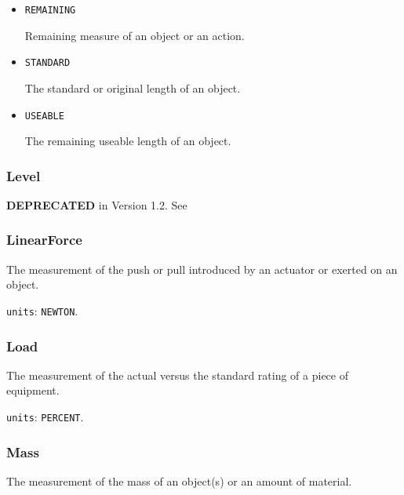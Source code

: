 \begin{itemize}

\item \texttt{REMAINING}


Remaining measure of an object or an action.

\item \texttt{STANDARD}


The standard or original length of an object.

\item \texttt{USEABLE}


The remaining useable length of an object.


\end{itemize}






\subsubsection{Level}
\label{sec:Level}



\textbf{DEPRECATED} in Version 1.2.  See 



\subsubsection{LinearForce}
\label{sec:LinearForce}



The measurement of the push or pull introduced by an actuator or exerted on an object.


\texttt{units}: \texttt{NEWTON}.


\subsubsection{Load}
\label{sec:Load}



The measurement of the actual versus the standard rating of a piece of equipment.


\texttt{units}: \texttt{PERCENT}.


\subsubsection{Mass}
\label{sec:Mass}



The measurement of the mass of an object(s) or an amount of material.


